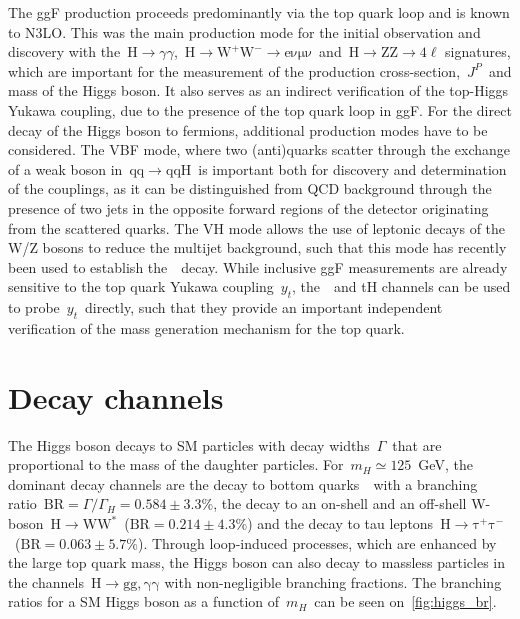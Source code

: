 The ggF production proceeds predominantly via the top quark loop and is known to N3LO. This was the main production mode for the initial observation and discovery with the~$\mathrm{H} \rightarrow \gamma \gamma$,~$\mathrm{H} \rightarrow \mathrm{W}^+\mathrm{W}^- \rightarrow \mathrm{e} \mathrm{\nu} \mathrm{\mu} \mathrm{\nu}$~and~$\mathrm{H} \rightarrow \mathrm{Z}\mathrm{Z} \rightarrow 4\ell$ signatures, which are important for the measurement of the production cross-section,~$J^P$~and mass of the Higgs boson. It also serves as an indirect verification of the top-Higgs Yukawa coupling, due to the presence of the top quark loop in ggF. For the direct decay of the Higgs boson to fermions, additional production modes have to be considered. The VBF mode, where two (anti)quarks scatter through the exchange of a weak boson in~$\mathrm{qq} \rightarrow \mathrm{qqH}$~is important both for discovery and determination of the couplings, as it can be distinguished from QCD background through the presence of two jets in the opposite forward regions of the detector originating from the scattered quarks. The VH mode allows the use of leptonic decays of the W/Z bosons to reduce the multijet background, such that this mode has recently been used to establish the~\Hbb~decay. While inclusive ggF measurements are already sensitive to the top quark Yukawa coupling~$y_t$, the~\ttH~and tH channels can be used to probe~$y_t$~directly, such that they provide an important independent verification of the mass generation mechanism for the top quark.

\section{Decay channels}
The Higgs boson decays to SM particles with decay widths~$\Gamma$~that are proportional to the mass of the daughter particles. For~$m_H
\simeq 125$~GeV, the dominant decay channels are the decay to bottom quarks~\Hbb~with a branching ratio~$\mathrm{BR} = \Gamma/\Gamma_{H} = 0.584 \pm 3.3\%$, the decay to an on-shell and an off-shell W-boson~$\mathrm{H}\rightarrow \mathrm{W} \mathrm{W}^*$~($\mathrm{BR} = 0.214\pm4.3\%$) and the decay to tau leptons~$\mathrm{H} \rightarrow \mathrm{\tau}^+ \mathrm{\tau}^-$~($\mathrm{BR} = 0.063 \pm 5.7\%$). Through loop-induced processes, which are enhanced by the large top quark mass, the Higgs boson can also decay to massless particles in the channels~$\mathrm{H} \rightarrow \mathrm{g} \mathrm{g}, \mathrm{\gamma}\mathrm{\gamma}$ with non-negligible branching fractions. The branching ratios for a SM Higgs boson as a function of~$m_H$~can be seen on~\cref{fig:higgs_br}.

